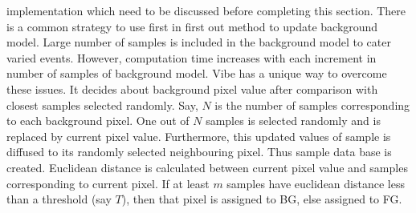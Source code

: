 implementation which need to be discussed before completing this
section. There is a common strategy to use first in first out method to
update background model. Large number of samples is included in the
background model to cater varied events. However, computation time
increases with each increment in number of samples of background model.
Vibe has a unique way to overcome these issues. It decides about
background pixel value after comparison with closest samples selected
randomly. Say, $N$ is the number of samples corresponding to each
background pixel. One out of $N$ samples is selected
randomly and is replaced by current pixel value. Furthermore, this
updated values of sample is diffused to its randomly selected
neighbouring pixel. Thus sample data base is created. Euclidean distance
is calculated between current pixel value and samples corresponding to
current pixel. If at least $m$ samples have euclidean distance less than
a threshold (say $T$), then that pixel is assigned to BG, else assigned to
FG.
